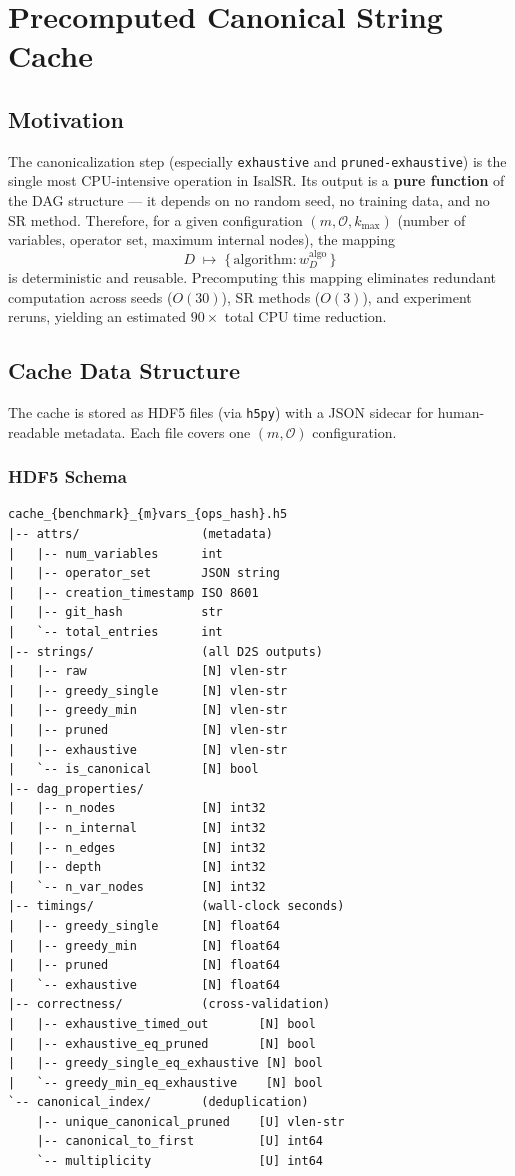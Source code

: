 \section{Precomputed Canonical String Cache}
\label{sec:precomputed}

\subsection{Motivation}

The canonicalization step (especially \texttt{exhaustive} and \texttt{pruned-exhaustive})
is the single most CPU-intensive operation in IsalSR. Its output is a \textbf{pure function}
of the DAG structure --- it depends on no random seed, no training data, and no SR method.
Therefore, for a given configuration $(m, \mathcal{O}, k_{\max})$ (number of variables,
operator set, maximum internal nodes), the mapping
\[
  D \;\mapsto\; \bigl\{\,\text{algorithm} : w_D^{\text{algo}}\,\bigr\}
\]
is deterministic and reusable. Precomputing this mapping eliminates redundant computation
across seeds ($O(30)$), SR methods ($O(3)$), and experiment reruns, yielding an estimated
$90\times$ total CPU time reduction.

\subsection{Cache Data Structure}

The cache is stored as HDF5 files (via \texttt{h5py}) with a JSON sidecar for
human-readable metadata. Each file covers one $(m, \mathcal{O})$ configuration.

\subsubsection{HDF5 Schema}

\begin{verbatim}
cache_{benchmark}_{m}vars_{ops_hash}.h5
|-- attrs/                 (metadata)
|   |-- num_variables      int
|   |-- operator_set       JSON string
|   |-- creation_timestamp ISO 8601
|   |-- git_hash           str
|   `-- total_entries      int
|-- strings/               (all D2S outputs)
|   |-- raw                [N] vlen-str
|   |-- greedy_single      [N] vlen-str
|   |-- greedy_min         [N] vlen-str
|   |-- pruned             [N] vlen-str
|   |-- exhaustive         [N] vlen-str
|   `-- is_canonical       [N] bool
|-- dag_properties/
|   |-- n_nodes            [N] int32
|   |-- n_internal         [N] int32
|   |-- n_edges            [N] int32
|   |-- depth              [N] int32
|   `-- n_var_nodes        [N] int32
|-- timings/               (wall-clock seconds)
|   |-- greedy_single      [N] float64
|   |-- greedy_min         [N] float64
|   |-- pruned             [N] float64
|   `-- exhaustive         [N] float64
|-- correctness/           (cross-validation)
|   |-- exhaustive_timed_out       [N] bool
|   |-- exhaustive_eq_pruned       [N] bool
|   |-- greedy_single_eq_exhaustive [N] bool
|   `-- greedy_min_eq_exhaustive    [N] bool
`-- canonical_index/       (deduplication)
    |-- unique_canonical_pruned    [U] vlen-str
    |-- canonical_to_first         [U] int64
    `-- multiplicity               [U] int64
\end{verbatim}

